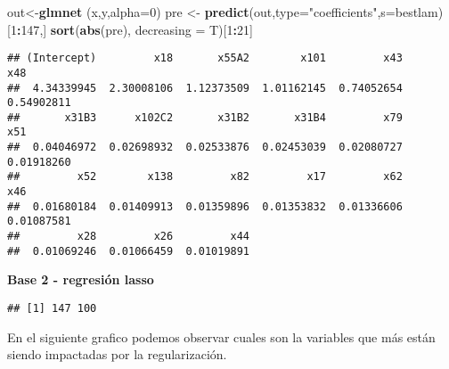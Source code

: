 \documentclass[
]{article}
\newenvironment{Shaded}{\begin{snugshade}}{\end{snugshade}}
\newcommand{\DataTypeTok}[1]{\textcolor[rgb]{0.13,0.29,0.53}{#1}}
\newcommand{\DecValTok}[1]{\textcolor[rgb]{0.00,0.00,0.81}{#1}}
\newcommand{\KeywordTok}[1]{\textcolor[rgb]{0.13,0.29,0.53}{\textbf{#1}}}
\newcommand{\NormalTok}[1]{#1}
\newcommand{\OperatorTok}[1]{\textcolor[rgb]{0.81,0.36,0.00}{\textbf{#1}}}
\newcommand{\StringTok}[1]{\textcolor[rgb]{0.31,0.60,0.02}{#1}}
\begin{document}
\begin{Shaded}
\begin{Highlighting}[]
\NormalTok{out<-}\KeywordTok{glmnet}\NormalTok{ (x,y,}\DataTypeTok{alpha=}\DecValTok{0}\NormalTok{) }
\NormalTok{pre <-}\StringTok{ }\KeywordTok{predict}\NormalTok{(out,}\DataTypeTok{type=}\StringTok{"coefficients"}\NormalTok{,}\DataTypeTok{s=}\NormalTok{bestlam)[}\DecValTok{1}\OperatorTok{:}\DecValTok{147}\NormalTok{,]}
\KeywordTok{sort}\NormalTok{(}\KeywordTok{abs}\NormalTok{(pre), }\DataTypeTok{decreasing =}\NormalTok{ T)[}\DecValTok{1}\OperatorTok{:}\DecValTok{21}\NormalTok{]}
\end{Highlighting}
\end{Shaded}

\begin{verbatim}
## (Intercept)         x18       x55A2        x101         x43         x48 
##  4.34339945  2.30008106  1.12373509  1.01162145  0.74052654  0.54902811 
##       x31B3      x102C2       x31B2       x31B4         x79         x51 
##  0.04046972  0.02698932  0.02533876  0.02453039  0.02080727  0.01918260 
##         x52        x138         x82         x17         x62         x46 
##  0.01680184  0.01409913  0.01359896  0.01353832  0.01336606  0.01087581 
##         x28         x26         x44 
##  0.01069246  0.01066459  0.01019891
\end{verbatim}

\textbf{Base 2 - regresión lasso}

\begin{Shaded}
\end{Shaded}

\begin{verbatim}
## [1] 147 100
\end{verbatim}

En el siguiente grafico podemos observar cuales son la variables que más
están siendo impactadas por la regularización.
\end{document}
